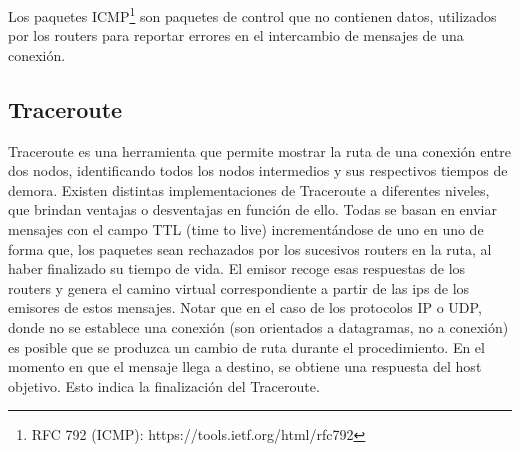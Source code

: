 Los paquetes ICMP\footnote{RFC 792 (ICMP): https://tools.ietf.org/html/rfc792} son paquetes de control que no contienen datos, utilizados por los routers para reportar errores en el intercambio de mensajes de una conexión.

\subsection{Traceroute}

Traceroute es una herramienta que permite mostrar la ruta de una conexión entre dos nodos, identificando todos los nodos intermedios y sus respectivos tiempos de demora. Existen distintas implementaciones de Traceroute a diferentes niveles, que brindan ventajas o desventajas en función de ello. Todas se basan en enviar mensajes con el campo TTL (time to live) incrementándose de uno en uno de forma que, los paquetes sean rechazados por los sucesivos routers en la ruta, al haber finalizado su tiempo de vida. El emisor recoge esas respuestas de los routers y genera el camino virtual correspondiente a partir de las ips de los emisores de estos mensajes. Notar que en el caso de los protocolos IP o UDP, donde no se establece una conexión (son orientados a datagramas, no a conexión) es posible que se produzca un cambio de ruta durante el procedimiento. En el momento en que el mensaje llega a destino, se obtiene una respuesta del host objetivo. Esto indica la finalización del Traceroute.
